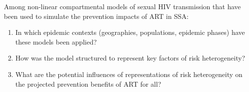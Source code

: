 Among non-linear compartmental models of sexual HIV transmission
that have been used to simulate the prevention impacts of ART in SSA:
\begin{enumerate}
\item\label{rq:1}
      In which epidemic contexts (geographies, populations, epidemic phases)
      have these models been applied?
\item\label{rq:2}
      How was the model structured to represent key factors of risk heterogeneity?
\item\label{rq:3}
      What are the potential influences of representations of risk heterogeneity
      on the projected prevention benefits of ART for all?
\end{enumerate}
